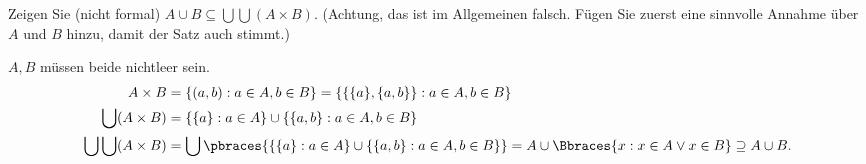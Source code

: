 
\begin{exercise}[265]

Zeigen Sie (nicht formal) $A \cup B \subseteq \bigcup \bigcup (A \times B)$.
(Achtung, das ist im Allgemeinen falsch. Fügen Sie zuerst eine sinnvolle Annahme
über $A$ und $B$ hinzu, damit der Satz auch stimmt.)

\end{exercise}


\begin{solution}
$A,B$ müssen beide nichtleer sein.
\begin{align*}
  A \times B &= \{(a,b): a \in A, b \in B\} = \{\{\{a\},\{a,b\}\}: a \in A, b \in B\} \\
  \bigcup (A \times B) &= \{ \{a\}: a \in A\} \cup \{\{a,b\}: a \in A, b \in B\}\\
  \bigcup \bigcup (A \times B) &= \bigcup \pbraces{\{ \{a\}: a \in A\} \cup \{\{a,b\}: a \in A, b \in B\}} = A \cup \Bbraces{x : x \in A \lor x \in B}
  \supseteq A \cup B.
\end{align*}

\end{solution}
